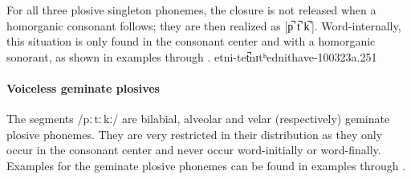 For all three plosive singleton phonemes, the closure is not released when a homorganic consonant %
follows; they are then realized as [p̚ t̚ k̚\,]. Word-internally, this situation is only found in the consonant center and with a homorganic sonorant, as shown in examples  through . 
{e{t}ni-t}{e{t̚}nɪtʰ}{ednit}{have-}{100323a}{.251}


\paragraph{Voiceless geminate plosives}
The segments /pː\,tː\,kː/ are bilabial, alveolar and velar (respectively) geminate plosive phonemes. They are very restricted in their distribution as they only occur in the consonant center %
and never occur word-initially or word-finally. %
Examples for the geminate plosive phonemes can be found in examples  through .

